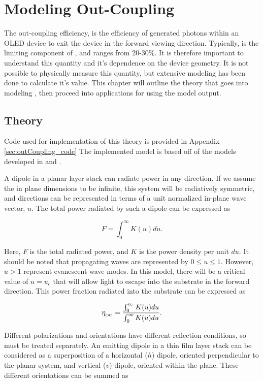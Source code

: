\documentclass[../thesis.tex]{subfiles}
\begin{document}
\chapter{Modeling Out-Coupling} \label{sec:out_coupling}

The out-coupling efficiency, \oc is the efficiency of generated photons within an OLED device to exit the device in the forward viewing direction.
Typically, \oc is the limiting component of \eqe, and ranges from 20-30\%.
It is therefore important to understand this quantity and it's dependence on the device geometry.
It is not possible to physically measure this quantity, but extensive modeling has been done to calculate it's value.\supercite{Meerheim2010,Furno2010,Furno2012,Neyts1998}
This chapter will outline the theory that goes into modeling \oc, then proceed into applications for using the model output.

\section{Theory}

Code used for implementation of this theory is provided in Appendix \ref{sec:outCoupling_code}
The implemented model is based off of the models developed in \textcite{Furno2010} and \textcite{Neyts1998}.

A dipole in a planar layer stack can radiate power in any direction.
If we assume the in plane dimensions to be infinite, this system will be radiatively symmetric, and directions can be represented in terms of a unit normalized in-plane wave vector, $u$.
The total power radiated by such a dipole can be expressed as 

\begin{equation}
F=\int_0^\infty K(u)du.
\end{equation}

Here, $F$ is the total radiated power, and $K$ is the power density per unit $du$.
It should be noted that propagating waves are represented by $0\le u\le 1$.
However, $u>1$ represent evanescent wave modes.
In this model, there will be a critical value of $u=u_c$ that will allow light to escape into the substrate in the forward direction.
This power fraction radiated into the substrate can be expressed as

\begin{equation}
\eta_{_\text{\tiny OC}}=\frac{\int_0^{u_c} K(u)du}{\int_0^\infty K(u)du}.
\label{eqn:out_oc_simple}
\end{equation}

Different polarizations and orientations have different reflection conditions, so must be treated separately.
An emitting dipole in a thin film layer stack can be considered as a superposition of a horizontal ($h$) dipole, oriented perpendicular to the planar system, and vertical ($v$) dipole, oriented within the plane.  
These different orientations can be summed as
\end{document}
